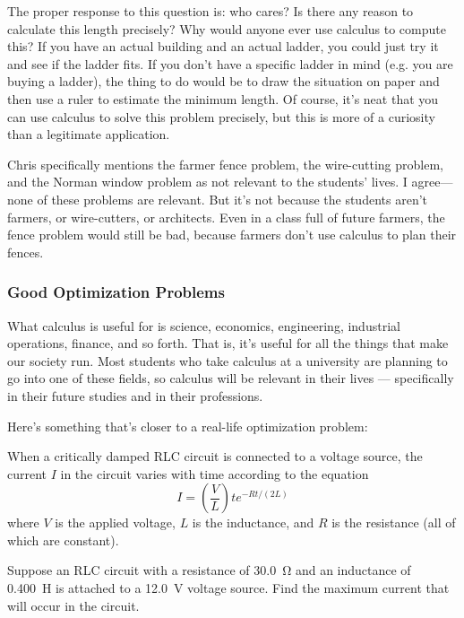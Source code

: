 The proper response to this question is: who cares? Is there any reason to calculate this length precisely? Why would anyone ever use calculus to compute this? If you have an actual building and an actual ladder, you could just try it and see if the ladder fits. If you don't have a specific ladder in mind (e.g. you are buying a ladder), the thing to do would be to draw the situation on paper and then use a ruler to estimate the minimum length. Of course, it's neat that you can use calculus to solve this problem precisely, but this is more of a curiosity than a legitimate application.

Chris specifically mentions the farmer fence problem, the wire-cutting problem, and the Norman window problem as not relevant to the students' lives. I agree—none of these problems are relevant. But it's not because the students aren't farmers, or wire-cutters, or architects. Even in a class full of future farmers, the fence problem would still be bad, because farmers don't use calculus to plan their fences.

\subsubsection*{Good Optimization Problems}
What calculus is useful for is science, economics, engineering, industrial operations, finance, and so forth. That is, it's useful for all the things that make our society run. Most students who take calculus at a university are planning to go into one of these fields, so calculus will be relevant in their lives --- specifically in their future studies and in their professions.

Here's something that's closer to a real-life optimization problem:

\begin{adjustwidth}{1cm}{}
  When a critically damped RLC circuit is connected to a voltage source, the current $ I $ in the circuit varies with time according to the equation
  \begin{displaymath}
    I = \left(\frac{V}{L}\right)te^{-Rt/(2L)}
  \end{displaymath}
  where $V$ is the applied voltage, $L$ is the inductance, and $R$ is the resistance (all of which are constant).

  Suppose an RLC circuit with a resistance of \SI{30.0}{\ohm} and an inductance of \SI{0.400}{\henry} is attached to a \SI{12.0}{\volt} voltage source. Find the maximum current that will occur in the circuit.
\end{adjustwidth}

